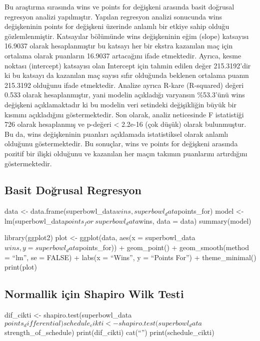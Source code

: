 \documentclass[
  12pt,
]{article}
\begin{document}
Bu araştırma sırasında wins ve points for değişkeni arasında basit doğrusal regresyon analizi yapılmıştır. Yapılan regresyon analizi sonucunda wins değişkeninin points for değişkeni üzerinde anlamlı bir etkiye sahip olduğu gözlemlenmiştir. Katsayılar bölümünde wins değişkeninin eğim (slope) katsayısı 16.9037 olarak hesaplanmıştır bu katsayı her bir ekstra kazanılan maç için ortalama olarak puanların 16.9037 artacağını ifade etmektedir. Ayrıca, kesme noktası (intercept) katsayısı olan Intercept için tahmin edilen değer 215.3192'dir ki bu katsayı da kazanılan maç sayısı sıfır olduğunda beklenen ortalama puanın 215.3192 olduğunu ifade etmektedir. Analize ayrıca R-kare (R-squared) değeri 0.533 olarak hesaplanmıştır, yani modelin açıkladığı varyansın \%53.3'ünü wins değişkeni açıklamaktadır ki bu modelin veri setindeki değişikliğin büyük bir kısmını açıkladığını göstermektedir. Son olarak, analiz neticesinde F istatistiği 726 olarak hesaplanmış ve p-değeri \textless{} 2.2e-16 (çok düşük) olarak bulunmuştur. Bu da, wins değişkeninin puanları açıklamada istatistiksel olarak anlamlı olduğunu göstermektedir. Bu sonuçlar, wins ve points for değişkeni arasında pozitif bir ilişki olduğunu ve kazanılan her maçın takımın puanlarını artırdığını göstermektedir.

\hypertarget{basit-doux11frusal-regresyon}{%
\subsection{Basit Doğrusal Regresyon}\label{basit-doux11frusal-regresyon}}

data \textless- data.frame(superbowl\_data\(wins, superbowl_data\)points\_for)
model \textless- lm(superbowl\_data\(points_for ~ superbowl_data\)wins, data = data)
summary(model)

library(ggplot2)
plot \textless- ggplot(data, aes(x = superbowl\_data\(wins, y = superbowl_data\)points\_for)) +
geom\_point() +
geom\_smooth(method = ``lm'', se = FALSE) +
labs(x = ``Wins'', y = ``Points For'') +
theme\_minimal()
print(plot)

\hypertarget{normallik-iuxe7in-shapiro-wilk-testi}{%
\subsection{Normallik için Shapiro Wilk Testi}\label{normallik-iuxe7in-shapiro-wilk-testi}}

dif\_cikti \textless- shapiro.test(superbowl\_data\(points_differential) schedule_cikti <- shapiro.test(superbowl_data\)strength\_of\_schedule)
print(dif\_cikti)
cat(``\n'')
print(schedule\_cikti)
\end{document}
